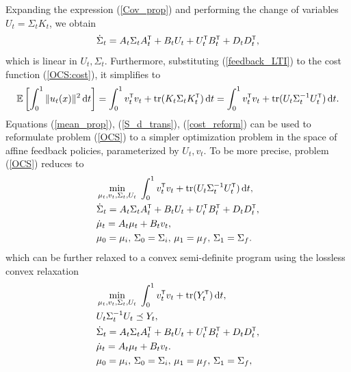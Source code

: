 \documentclass[twoside]{article}
\renewcommand{\eqref}[1]{(\ref{#1})}
\renewcommand{\t}{^{\mbox{\tiny\sf T}}} %
\renewcommand{\E}{\mathbb{E}}
\newcommand{\tr}{\mathrm{tr}}
\renewcommand{\d}{\mathrm{d}}
\begin{document}
%
%
Expanding the expression \eqref{Cov_prop} and performing the change of variables $U_t = \Sigma_t K_t$, we obtain 
\begin{equation} \label{S_d_trans}
    \dot{\Sigma}_t = A_t \Sigma_t A_t\t + B_t U_t + U_t\t B_t\t + D_t D_t\t,
\end{equation}
which is linear in $U_t, \Sigma_t$.
Furthermore, substituting \eqref{feedback_LTI} to the cost function \eqref{OCS:cost}, it simplifies to  
\begin{equation} \label{cost_reform}
    \E \left[ \int_{0}^{1}{ \| u_t(x) \|^2 \, \d t} \right] = \int_0^1 v_t\t v_t + \tr (K_t \Sigma_t K_t \t) \, \d t = \int_0^1 v_t\t v_t + \tr (U_t \Sigma_t^{-1} U_t \t) \, \d t.
\end{equation}
Equations \eqref{mean_prop}, \eqref{S_d_trans}, \eqref{cost_reform} can be used to reformulate problem \eqref{OCS} to a simpler optimization problem in the space of affine feedback policies, parameterized by $U_t, v_t$.
To be more precise, problem \eqref{OCS} reduces to 
\begin{subequations} \label{OCS_reform}
\begin{align}
& \min_{\mu_t, v_t, \Sigma_t, U_t} \; \int_0^1 v_t\t v_t + \tr (U_t \Sigma_t^{-1} U_t \t) \, \d t, \label{OCS_reform:cost} \\
& \dot{\Sigma}_t = A_t \Sigma_t A_t\t + B_t U_t + U_t\t B_t\t + D_t D_t\t,\label{OCS_reform:Cov} \\
& \dot{\mu}_t = A_t \mu_t + B_t v_t, \\
& \mu_0 = \mu_i, \, \Sigma_0 = \Sigma_i, \, \mu_1 = \mu_f, \, \Sigma_1 = \Sigma_f.
\label{OCS_reform:mean}
\end{align}
\end{subequations}
which can be further relaxed to a convex semi-definite program using the lossless convex relaxation~\cite{chen2015optimal2}
\begin{subequations} \label{cvx}
\begin{align}
& \min_{\mu_t, v_t, \Sigma_t, U_t} \; \int_0^1 v_t\t v_t + \tr (Y_t \t) \, \d t, \label{cvx:cost} \\
& U_t \Sigma_t^{-1} U_t \preceq  Y_t, \label{cvx:lmi} \\
& \dot{\Sigma}_t = A_t \Sigma_t A_t\t + B_t U_t + U_t\t B_t\t + D_t D_t\t,\label{cvx:cov} \\
& \dot{\mu}_t = A_t \mu_t + B_t v_t. \label{cvx:mean} \\
& \mu_0 = \mu_i, \, \Sigma_0 = \Sigma_i, \, \mu_1 = \mu_f, \, \Sigma_1 = \Sigma_f,
\end{align}
\end{subequations}
\end{document}
